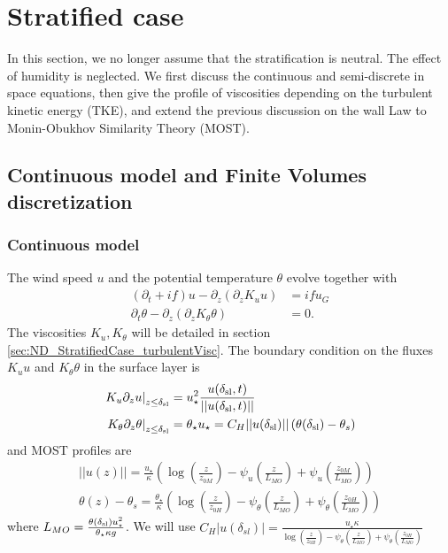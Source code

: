 \section{Stratified case}
In this section, we no longer assume that the stratification
is neutral. The effect of humidity is neglected.
We first discuss the continuous and semi-discrete in space
equations, then give the
profile of viscosities depending on the turbulent kinetic energy
(TKE), and extend the previous discussion on the wall Law to
Monin-Obukhov Similarity Theory (MOST).

\subsection{Continuous model and Finite Volumes discretization}
\subsubsection{Continuous model}
The wind speed $u$ and the potential temperature $\theta$ evolve
together with
\begin{equation}
\begin{aligned}
	\label{eq:ND_StratifiedCase_EkmanEq}
  (\partial_t + if) u - \partial_z (\partial_z K_u u) &= if u_G \\
  \partial_t \theta -\partial_z (\partial_z K_{\theta} \theta) &= 0.
\end{aligned}
\end{equation}
The viscosities $K_u, K_\theta$ will be detailed in section \ref{sec:ND_StratifiedCase_turbulentVisc}.
The boundary condition on the fluxes $K_u u$ and $K_\theta \theta$
in the surface layer is
\begin{equation}
\begin{aligned}
	\left.K_u \partial_z u \right|_{z\leq \delta_{\rm sl}}
	&= u_\star^2
	\frac{u(\delta_{\rm sl}, t)}{||u(\delta_{\rm sl}, t)||} \\
	\left.K_\theta \partial_z \theta
	\right|_{z\leq \delta_{\rm sl}}
	&= \theta_\star u_\star = C_H ||u(\delta_{\rm sl})||
	\left(\theta(\delta_{\rm sl}) - \theta_{s}\right)
\end{aligned}
\end{equation}
and MOST profiles are
\begin{equation}
\label{eq:ND_StratifiedCase_MOST}
\begin{aligned}
    ||u(z)|| = \frac{u_\star}{\kappa}
    \left(
	\log(\frac{z}{z_{0M}})
    - \psi_u(\frac{z}{L_{MO}})
	+ \psi_u(\frac{z_{0M}}{L_{MO}})
    \right)
    \\
    \theta(z) - \theta_s = 
    \frac{\theta_\star}{\kappa}
    \left(
	\log(\frac{z}{z_{0H}})
    - \psi_\theta(\frac{z}{L_{MO}})
	+ \psi_\theta(\frac{z_{0H}}{{L_{MO}}})
    \right)
\end{aligned}
\end{equation}
where $L_{MO} = \frac{\theta(\delta_{\rm sl})
u_\star^2}{\theta_\star \kappa g }$. We will use
$C_H|u(\delta_{sl})| = \frac{u_\star \kappa}{\log(\frac{z}{z_{0H}})
    - \psi_\theta(\frac{z}{L_{MO}})
    + \psi_\theta(\frac{z_{0H}}{{L_{MO}}})}$

